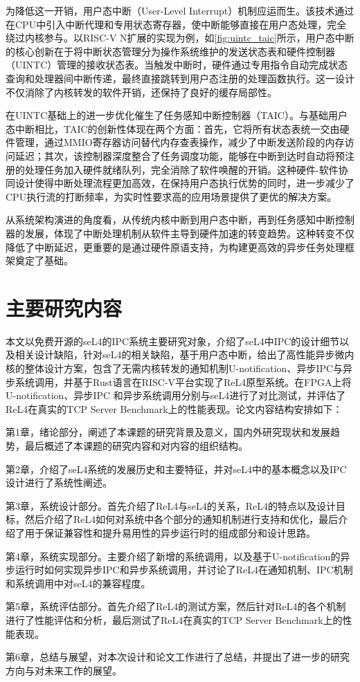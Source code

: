 为降低这一开销，用户态中断（User-Level Interrupt）机制应运而生。该技术通过在CPU中引入中断代理和专用状态寄存器，使中断能够直接在用户态处理，完全绕过内核参与。以RISC-V N扩展的实现为例，如\ref{fig:uintc_taic}所示，用户态中断的核心创新在于将中断状态管理分为操作系统维护的发送状态表和硬件控制器（UINTC）管理的接收状态表。当触发中断时，硬件通过专用指令自动完成状态查询和处理器间中断传递，最终直接跳转到用户态注册的处理函数执行。这一设计不仅消除了内核转发的软件开销，还保持了良好的缓存局部性。


在UINTC基础上的进一步优化催生了任务感知中断控制器（TAIC）。与基础用户态中断相比，TAIC的创新性体现在两个方面：首先，它将所有状态表统一交由硬件管理，通过MMIO寄存器访问替代内存查表操作，减少了中断发送阶段的内存访问延迟；其次，该控制器深度整合了任务调度功能，能够在中断到达时自动将预注册的处理任务加入硬件就绪队列，完全消除了软件唤醒的开销。这种硬件-软件协同设计使得中断处理流程更加高效，在保持用户态执行优势的同时，进一步减少了CPU执行流的打断频率，为实时性要求高的应用场景提供了更优的解决方案。

从系统架构演进的角度看，从传统内核中断到用户态中断，再到任务感知中断控制器的发展，体现了中断处理机制从软件主导到硬件加速的转变趋势。这种转变不仅降低了中断延迟，更重要的是通过硬件原语支持，为构建更高效的异步任务处理框架奠定了基础。


\section{主要研究内容}
本文以免费开源的seL4的IPC系统主要研究对象，介绍了seL4中IPC的设计细节以及相关设计缺陷，针对seL4的相关缺陷，基于用户态中断，给出了高性能异步微内核的整体设计方案，包含了无需内核转发的通知机制U-notification、异步IPC与异步系统调用，并基于Rust语言在RISC-V平台实现了ReL4原型系统。在FPGA上将U-notification、异步IPC 和异步系统调用分别与seL4进行了对比测试，并评估了ReL4在真实的TCP Server Benchmark上的性能表现。论文内容结构安排如下：

第1章，绪论部分，阐述了本课题的研究背景及意义，国内外研究现状和发展趋势，最后概述了本课题的研究内容和对内容的组织结构。

第2章，介绍了seL4系统的发展历史和主要特征，并对seL4中的基本概念以及IPC设计进行了系统性阐述。

第3章，系统设计部分。首先介绍了ReL4与seL4的关系，ReL4的特点以及设计目标，然后介绍了ReL4如何对系统中各个部分的通知机制进行支持和优化，最后介绍了用于保证兼容性和提升易用性的异步运行时的组成部分和设计思路。

第4章，系统实现部分。主要介绍了新增的系统调用，以及基于U-notification的异步运行时如何实现异步IPC和异步系统调用，并讨论了ReL4在通知机制、IPC机制和系统调用中对seL4的兼容程度。

第5章，系统评估部分。首先介绍了ReL4的测试方案，然后针对ReL4的各个机制进行了性能评估和分析，最后测试了ReL4在真实的TCP Server Benchmark上的性能表现。

第6章，总结与展望，对本次设计和论文工作进行了总结，并提出了进一步的研究方向与对未来工作的展望。